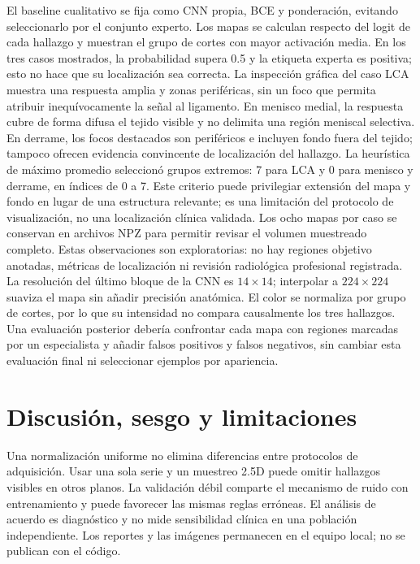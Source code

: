 El baseline cualitativo se fija como CNN propia, BCE y ponderación, evitando seleccionarlo por el conjunto experto.
Los mapas se calculan respecto del logit de cada hallazgo y muestran el grupo de cortes con mayor activación media.
En los tres casos mostrados, la probabilidad supera 0.5 y la etiqueta experta es positiva;
esto no hace que su localización sea correcta. La inspección gráfica del caso LCA muestra una
respuesta amplia y zonas periféricas, sin un foco que permita atribuir inequívocamente la señal al ligamento.
En menisco medial, la respuesta cubre de forma difusa el tejido visible y no delimita una región
meniscal selectiva. En derrame, los focos destacados son periféricos e incluyen fondo fuera del tejido;
tampoco ofrecen evidencia convincente de localización del hallazgo.
La heurística de máximo promedio seleccionó grupos extremos: 7 para LCA y 0 para menisco y derrame,
en índices de 0 a 7. Este criterio puede privilegiar extensión del mapa y fondo en lugar de una
estructura relevante; es una limitación del protocolo de visualización, no una localización clínica validada.
Los ocho mapas por caso se conservan en archivos NPZ para permitir revisar el volumen muestreado completo.
Estas observaciones son exploratorias: no hay regiones objetivo anotadas, métricas de localización ni
revisión radiológica profesional registrada. La resolución del último bloque de la CNN es $14\times14$;
interpolar a $224\times224$ suaviza el mapa sin añadir precisión anatómica. El color se normaliza por
grupo de cortes, por lo que su intensidad no compara causalmente los tres hallazgos. Una evaluación
posterior debería confrontar cada mapa con regiones marcadas por un especialista y añadir falsos positivos
y falsos negativos, sin cambiar esta evaluación final ni seleccionar ejemplos por apariencia.

\section{Discusión, sesgo y limitaciones}

Una normalización uniforme no elimina diferencias entre protocolos de adquisición.
Usar una sola serie y un muestreo 2.5D puede omitir hallazgos visibles en otros planos.
La validación débil comparte el mecanismo de ruido con entrenamiento y puede favorecer las mismas reglas erróneas.
El análisis de acuerdo es diagnóstico y no mide sensibilidad clínica en una población independiente.
Los reportes y las imágenes permanecen en el equipo local; no se publican con el código.


